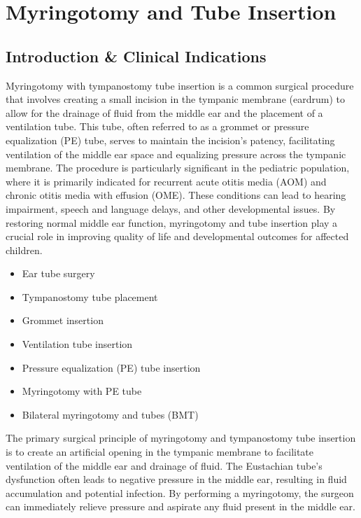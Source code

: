 \chapter{Myringotomy and Tube Insertion}

\section*{Introduction \& Clinical Indications}
Myringotomy with tympanostomy tube insertion is a common surgical procedure that involves creating a small incision in the tympanic membrane (eardrum) to allow for the drainage of fluid from the middle ear and the placement of a ventilation tube. This tube, often referred to as a grommet or pressure equalization (PE) tube, serves to maintain the incision's patency, facilitating ventilation of the middle ear space and equalizing pressure across the tympanic membrane. The procedure is particularly significant in the pediatric population, where it is primarily indicated for recurrent acute otitis media (AOM) and chronic otitis media with effusion (OME). These conditions can lead to hearing impairment, speech and language delays, and other developmental issues. By restoring normal middle ear function, myringotomy and tube insertion play a crucial role in improving quality of life and developmental outcomes for affected children.

\begin{itemize}
  \item Ear tube surgery
  \item Tympanostomy tube placement
  \item Grommet insertion
  \item Ventilation tube insertion
  \item Pressure equalization (PE) tube insertion
  \item Myringotomy with PE tube
  \item Bilateral myringotomy and tubes (BMT)
\end{itemize}

The primary surgical principle of myringotomy and tympanostomy tube insertion is to create an artificial opening in the tympanic membrane to facilitate ventilation of the middle ear and drainage of fluid. The Eustachian tube's dysfunction often leads to negative pressure in the middle ear, resulting in fluid accumulation and potential infection. By performing a myringotomy, the surgeon can immediately relieve pressure and aspirate any fluid present in the middle ear.

